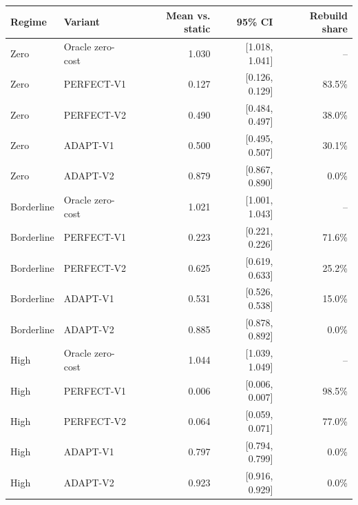 \begin{tabular}{llrrr}
\toprule
Regime & Variant & Mean vs. static & 95\% CI & Rebuild share \\
\midrule
Zero & Oracle zero-cost & 1.030 & [1.018, 1.041] & -- \\
Zero & PERFECT-V1 & 0.127 & [0.126, 0.129] & 83.5\% \\
Zero & PERFECT-V2 & 0.490 & [0.484, 0.497] & 38.0\% \\
Zero & ADAPT-V1 & 0.500 & [0.495, 0.507] & 30.1\% \\
Zero & ADAPT-V2 & 0.879 & [0.867, 0.890] & 0.0\% \\
\midrule
Borderline & Oracle zero-cost & 1.021 & [1.001, 1.043] & -- \\
Borderline & PERFECT-V1 & 0.223 & [0.221, 0.226] & 71.6\% \\
Borderline & PERFECT-V2 & 0.625 & [0.619, 0.633] & 25.2\% \\
Borderline & ADAPT-V1 & 0.531 & [0.526, 0.538] & 15.0\% \\
Borderline & ADAPT-V2 & 0.885 & [0.878, 0.892] & 0.0\% \\
\midrule
High & Oracle zero-cost & 1.044 & [1.039, 1.049] & -- \\
High & PERFECT-V1 & 0.006 & [0.006, 0.007] & 98.5\% \\
High & PERFECT-V2 & 0.064 & [0.059, 0.071] & 77.0\% \\
High & ADAPT-V1 & 0.797 & [0.794, 0.799] & 0.0\% \\
High & ADAPT-V2 & 0.923 & [0.916, 0.929] & 0.0\% \\
\bottomrule
\end{tabular}

